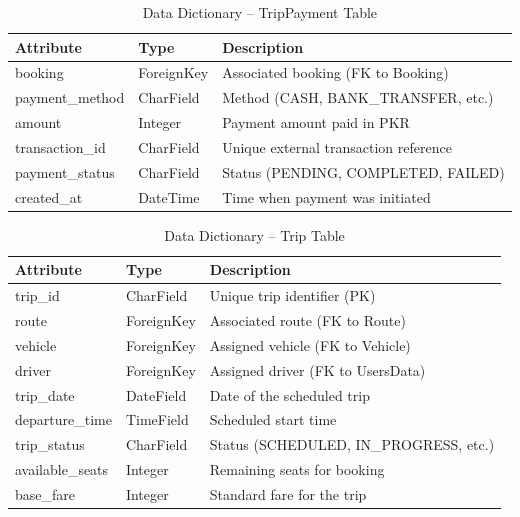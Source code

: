\begin{table}[H]
\centering
\caption{Data Dictionary – TripPayment Table}
\renewcommand{\arraystretch}{1.5}
\begin{tabular}{|p{3cm}|p{3cm}|p{7cm}|}
\hline
\textbf{Attribute} & \textbf{Type} & \textbf{Description} \\
\hline
booking & ForeignKey & Associated booking (FK to Booking) \\
\hline
payment\_method & CharField & Method (CASH, BANK\_TRANSFER, etc.) \\
\hline
amount & Integer & Payment amount paid in PKR \\
\hline
transaction\_id & CharField & Unique external transaction reference \\
\hline
payment\_status & CharField & Status (PENDING, COMPLETED, FAILED) \\
\hline
created\_at & DateTime & Time when payment was initiated \\
\hline
\end{tabular}
\end{table}

\begin{table}[H]
\centering
\caption{Data Dictionary – Trip Table}
\renewcommand{\arraystretch}{1.5}
\begin{tabular}{|p{3cm}|p{3cm}|p{7cm}|}
\hline
\textbf{Attribute} & \textbf{Type} & \textbf{Description} \\
\hline
trip\_id & CharField & Unique trip identifier (PK) \\
\hline
route & ForeignKey & Associated route (FK to Route) \\
\hline
vehicle & ForeignKey & Assigned vehicle (FK to Vehicle) \\
\hline
driver & ForeignKey & Assigned driver (FK to UsersData) \\
\hline
trip\_date & DateField & Date of the scheduled trip \\
\hline
departure\_time & TimeField & Scheduled start time \\
\hline
trip\_status & CharField & Status (SCHEDULED, IN\_PROGRESS, etc.) \\
\hline
available\_seats & Integer & Remaining seats for booking \\
\hline
base\_fare & Integer & Standard fare for the trip \\
\hline
\end{tabular}
\end{table}

